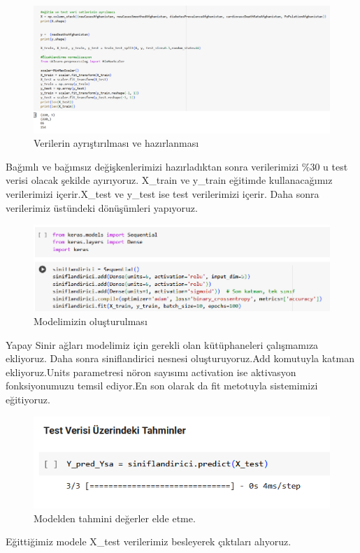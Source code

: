 \documentclass[12pt, a4paper]{article}
\begin{document}
	\begin{figure}[!h]
		\centering
		\includegraphics{5.4.png}
		\caption{Verilerin ayrıştırılması ve hazırlanması}
	\end{figure}
	\newpage
	Bağımlı ve bağımsız değişkenlerimizi hazırladıktan sonra verilerimizi \%30 u test verisi olacak şekilde ayırıyoruz. X\_train ve y\_train eğitimde kullanacağımız verilerimizi içerir.X\_test ve y\_test ise test verilerimizi içerir. Daha sonra verilerimiz üstündeki dönüşümleri yapıyoruz.
	
	\begin{figure}[!h]
		\centering
		\includegraphics{5.5.png}
		\caption{Modelimizin oluşturulması}
	\end{figure}
	\newpage
	Yapay Sinir ağları modelimiz için gerekli olan kütüphaneleri çalışmamıza ekliyoruz. Daha sonra siniflandirici nesnesi oluşturuyoruz.Add komutuyla katman ekliyoruz.Units parametresi nöron sayısımı activation ise aktivasyon fonksiyonumuzu temsil ediyor.En son olarak da fit metotuyla sistemimizi eğitiyoruz.
	
	\begin{figure}[!h]
		\centering
		\includegraphics{5.6.png}
		\caption{Modelden tahmini değerler elde etme.}
	\end{figure}
	Eğittiğimiz modele X\_test verilerimiz besleyerek çıktıları alıyoruz.
	
\end{document}
